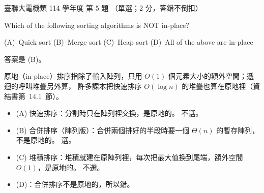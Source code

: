 \begin{pastexam}[label={px:ust-114-ee-ds-05}]{臺聯大電機類 114 學年度 第 5 題}
（單選；2 分，答錯不倒扣）

Which of the following sorting algorithms is NOT in-place?

(A)~Quick sort \qquad (B)~Merge sort \qquad (C)~Heap sort \qquad (D)~All of the above are in-place
\end{pastexam}

\begin{pastsoln}
答案是 (B)。

原地（in-place）排序指除了輸入陣列，只用 $O(1)$ 個元素大小的額外空間；遞迴的呼叫堆疊另外算，
許多課本把快速排序 $O(\log n)$ 的堆疊也算在原地裡（資結書第~14.1~節）。
\begin{itemize}
\item (A) 快速排序：分割時只在陣列裡交換，是原地的。 不選。
\item (B) 合併排序（陣列版）：合併兩個排好的半段時要一個 $\Theta(n)$ 的暫存陣列，不是原地的。 選。
\item (C) 堆積排序：堆積就建在原陣列裡，每次把最大值換到尾端，額外空間 $O(1)$，是原地的。 不選。
\item (D)：合併排序不是原地的，所以錯。
\end{itemize}
\end{pastsoln}

